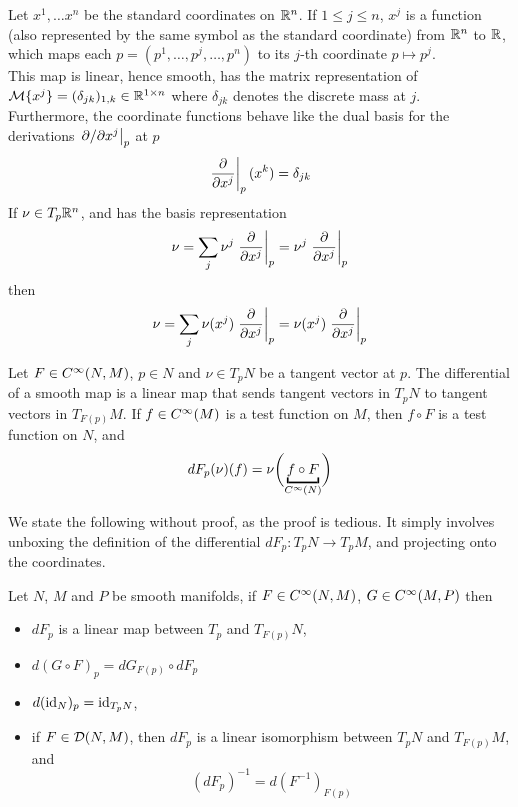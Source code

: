 \documentclass[../main-manifolds.tex]{subfiles}
\begin{document}
\begin{definition}
    Let $x^1,\ldots x^n$ be the standard coordinates on ${\mathbb{R}^n}$. If $1\leq j\leq n$, $x^j$ is a function (also represented by the same symbol as the standard coordinate) from ${\mathbb{R}^n}$ to $\mathbb{R}$, which maps each $p = (p^1,\ldots,p^j,\ldots, p^n)$ to its $j$-th coordinate $p\mapsto p^j$.\\

    This map is linear, hence smooth, has the matrix representation of $\mathcal{M}\{x^j\}=(\delta_{jk})_{1,k}\in \mathbb{R}^{1\times n}$ where $\delta_{jk}$ denotes the discrete mass at $j$.\\

    Furthermore, the coordinate functions behave like the dual basis for the derivations $\eval{\partial/\partial x^j}_p$ at $p$
    \[
        \eval{\pdv{x^j}}_{p}(x^k) = \delta_{jk}
    \]
    If $\nu\in T_p{\mathbb{R}^n}$, and has the basis representation
    \[
        \nu = \sum_{j}\nu^j\eval{\pdv{x^j}}_{p} = \nu^j\eval{\pdv{x^j}}_{p}
    \]
    then 
    \begin{equation}\label{lee-chp3:derivation-in-realn-projection-using-coordinate-functions}
        \nu = \sum_j \nu(x^j)\eval{\pdv{x^j}}_{p} = \nu(x^j)\eval{\pdv{x^j}}_{p}
    \end{equation}
\end{definition}

\begin{definition}
    Let $F\in\cinf[N,M]$, $p\in N$ and $\nu\in T_pN$ be a tangent vector at $p$. The differential of a smooth map is a linear map that sends tangent vectors in $T_pN$ to tangent vectors in $T_{F(p)}M$. If $f\in \cinf[M]$ is a test function on $M$, then $f\circ F$ is a test function on $N$, and
    \[
        dF_p(\nu)(f) = \nu\biggl(\underbracket{f\circ F}_{\cinf[N]}\biggr)
    \]
\end{definition}
We state the following without proof, as the proof is tedious. It simply involves unboxing the definition of the differential $dF_p: T_pN\to T_p M$, and projecting onto the coordinates.
\begin{wts}\label{lee-chp3:properties-of-differential}
    Let $N$, $M$ and $P$ be smooth manifolds, if $F\in\cinf[N,M]$, $G\in \cinf[M,P]$ then
    \begin{itemize}
        \item $dF_p$ is a linear map between $T_p$ and $T_{F(p)}N$,
        \item $d(G\circ F)_p = dG_{F(p)}\circ dF_p$
        \item $d({\operatorname{id}_{N}})_p=\operatorname{id}_{T_pN}$,
        \item if $F\in\diffeo[N,M]$, then $dF_p$ is a linear isomorphism between $T_pN$ and $T_{F(p)}M$, and
        \[
            (dF_p)^{-1}=d(F^{-1})_{F(p)}
        \]
    \end{itemize}
\end{wts}
\end{document}
